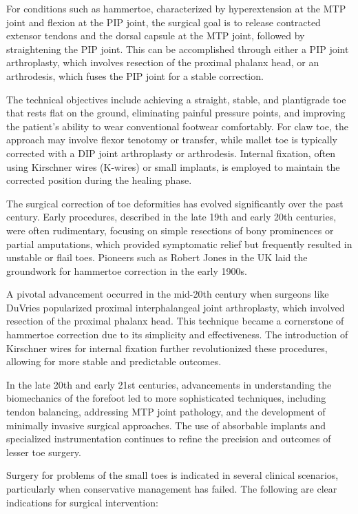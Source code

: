 For conditions such as hammertoe, characterized by hyperextension at the MTP joint and flexion at the PIP joint, the surgical goal is to release contracted extensor tendons and the dorsal capsule at the MTP joint, followed by straightening the PIP joint. This can be accomplished through either a PIP joint arthroplasty, which involves resection of the proximal phalanx head, or an arthrodesis, which fuses the PIP joint for a stable correction. 

The technical objectives include achieving a straight, stable, and plantigrade toe that rests flat on the ground, eliminating painful pressure points, and improving the patient's ability to wear conventional footwear comfortably. For claw toe, the approach may involve flexor tenotomy or transfer, while mallet toe is typically corrected with a DIP joint arthroplasty or arthrodesis. Internal fixation, often using Kirschner wires (K-wires) or small implants, is employed to maintain the corrected position during the healing phase.

The surgical correction of toe deformities has evolved significantly over the past century. Early procedures, described in the late 19th and early 20th centuries, were often rudimentary, focusing on simple resections of bony prominences or partial amputations, which provided symptomatic relief but frequently resulted in unstable or flail toes. Pioneers such as Robert Jones in the UK laid the groundwork for hammertoe correction in the early 1900s.

A pivotal advancement occurred in the mid-20th century when surgeons like DuVries popularized proximal interphalangeal joint arthroplasty, which involved resection of the proximal phalanx head. This technique became a cornerstone of hammertoe correction due to its simplicity and effectiveness. The introduction of Kirschner wires for internal fixation further revolutionized these procedures, allowing for more stable and predictable outcomes.

In the late 20th and early 21st centuries, advancements in understanding the biomechanics of the forefoot led to more sophisticated techniques, including tendon balancing, addressing MTP joint pathology, and the development of minimally invasive surgical approaches. The use of absorbable implants and specialized instrumentation continues to refine the precision and outcomes of lesser toe surgery.

Surgery for problems of the small toes is indicated in several clinical scenarios, particularly when conservative management has failed. The following are clear indications for surgical intervention:

